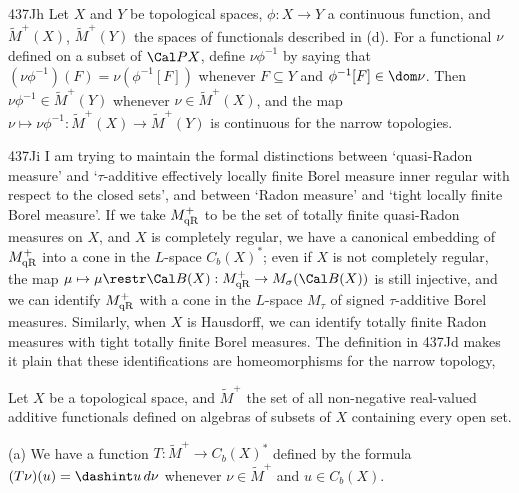 \spheader 437Jh
Let $X$ and $Y$ be topological spaces, $\phi:X\to Y$ a
continuous function, and $\tilde M^+(X)$, $\tilde M^+(Y)$ the spaces of
functionals described in (d).   For a functional $\nu$ defined on a subset
of $\Cal PX$, define
$\nu\phi^{-1}$ by saying that $(\nu\phi^{-1})(F)=\nu(\phi^{-1}[F])$
whenever $F\subseteq Y$ and $\phi^{-1}[F]\in\dom\nu$.   Then
$\nu\phi^{-1}\in\tilde M^+(Y)$ whenever $\nu\in\tilde M^+(X)$, and
the map $\nu\mapsto\nu\phi^{-1}:\tilde M^+(X)\to\tilde M^+(Y)$ is
continuous for the narrow topologies.

\spheader 437Ji I am trying to
maintain the formal distinctions between `quasi-Radon measure' and
`$\tau$-additive effectively locally finite Borel measure inner regular
with respect to the closed sets', and between `Radon measure' and
`tight locally finite Borel measure'.      If we 
take $M^+_{\text{qR}}$ to be the set of totally
finite quasi-Radon measures on $X$, and $X$ is completely regular,
we have a canonical embedding of $M^+_{\text{qR}}$ into a cone in the
$L$-space $C_b(X)^*$;
 even if $X$ is 
not completely regular, the map
$\mu\mapsto\mu\restr\Cal B(X):\MqR\to M_{\sigma}(\Cal B(X))$
is still injective,
and we can identify $M^+_{\text{qR}}$ with a cone in the $L$-space
$M_{\tau}$ of
signed $\tau$-additive Borel measures.
Similarly, when $X$ is Hausdorff, we can identify totally finite Radon
measures with tight totally finite Borel measures.   The 
definition in 437Jd makes it plain that these
identifications are homeomorphisms for the narrow topology,



 Let $X$ be a topological space, and
$\tilde M^+$ the set of all non-negative real-valued additive
functionals defined on algebras of subsets of $X$ containing every open
set.

(a) We have a function $T:\tilde M^+\to C_b(X)^*$ defined by the formula
$(T\nu)(u)=\dashint u\,d\nu$ whenever $\nu\in\tilde M^+$ and
$u\in C_b(X)$.

